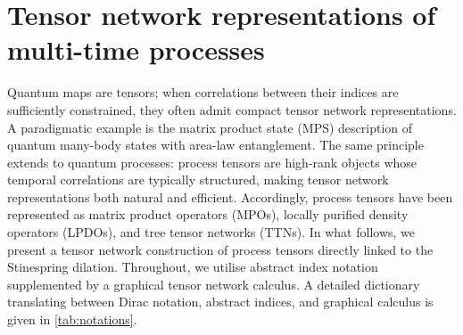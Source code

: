 \section{Tensor network representations of multi-time processes}\label{sec:pt-tn}
Quantum maps are tensors; when correlations between their indices are sufficiently constrained, they often admit compact tensor network representations. A paradigmatic example is the matrix product state (MPS) description of quantum many-body states with area-law entanglement. The same principle extends to quantum processes: process tensors are high-rank objects whose temporal correlations are typically structured, making tensor network representations both natural and efficient. Accordingly, process tensors have been represented as matrix product operators (MPOs), locally purified density operators (LPDOs), and tree tensor networks (TTNs). In what follows, we present a tensor network construction of process tensors directly linked to the Stinespring dilation. Throughout, we utilise abstract index notation supplemented by a graphical tensor network calculus. A detailed dictionary translating between Dirac notation, abstract indices, and graphical calculus is given in \cref{tab:notations}.

